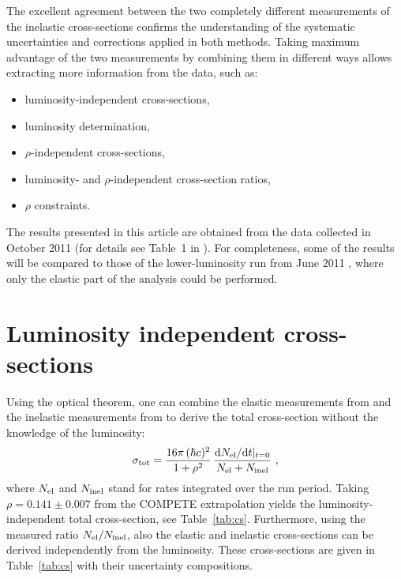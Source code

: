 \documentclass[doublecol]{epl/epl2}
\def\d{{\rm d}}
\begin{document}
The excellent agreement between the two completely different measurements of the inelastic cross-sections confirms the understanding of the systematic uncertainties and corrections applied in both methods. Taking maximum advantage of the two measurements by combining them in different ways allows extracting more information from the data, such as:
\begin{itemize}
\setlength{\itemsep}{-4pt}%
\item luminosity-independent cross-sections,
\item luminosity determination,
\item $\rho$-independent cross-sections,
\item luminosity- and $\rho$-independent cross-section ratios,
\item $\rho$ constraints.
\end{itemize}

The results presented in this article are obtained from the data collected in October 2011 (for details see Table~1 in \cite{P1}). For completeness, some of the results will be compared to those of the lower-luminosity run from June 2011 \cite{epl96}, where only the elastic part of the analysis could be performed.


\section{Luminosity independent cross-sections}

Using the optical theorem, one can combine the elastic measurements from \cite{P1} and the inelastic measurements from \cite{P2} to derive the total cross-section without the knowledge of the luminosity:
\begin{equation}
\label{eq:m lumi indep}
	\sigma_{\rm tot} = {16\pi\, (\hbar c)^2\over 1 + \rho^2}\, {\d N_{\rm el}/\d t|_{t=0} \over N_{\rm el} + N_{\rm inel} }\ ,
\end{equation}
where $N_{\rm el}$ and $N_{\rm inel}$ stand for rates integrated over the run period. Taking $\rho = 0.141\pm 0.007$ from the COMPETE extrapolation \cite{compete} yields the luminosity-independent total cross-section, see Table~\ref{tab:cs}. Furthermore, using the measured ratio $N_{\rm el} / N_{\rm inel}$, also the elastic and inelastic cross-sections can be derived independently from the luminosity. These cross-sections are given in Table~\ref{tab:cs} with their uncertainty compositions.
\end{document}
